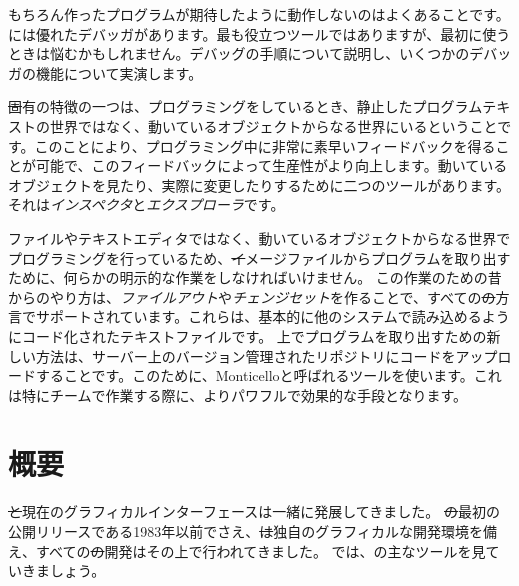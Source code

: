 \documentclass[a4paper,10pt,twoside]{book}
\begin{document}
もちろん作ったプログラムが期待したように動作しないのはよくあることです。\pharo には優れたデバッガがあります。最も役立つツールではありますが、最初に使うときは悩むかもしれません。デバッグの手順について説明し、いくつかのデバッガの機能について実演します。

\st 固有の特徴の一つは、プログラミングをしているとき、静止したプログラムテキストの世界ではなく、動いているオブジェクトからなる世界にいるということです。このことにより、プログラミング中に非常に素早いフィードバックを得ることが可能で、このフィードバックによって生産性がより向上します。動いているオブジェクトを見たり、実際に変更したりするために二つのツールがあります。それは\emph{インスペクタ}と\emph{エクスプローラ}です。

ファイルやテキストエディタではなく、動いているオブジェクトからなる世界でプログラミングを行っているため、\st イメージファイルからプログラムを取り出すために、何らかの明示的な作業をしなければいけません。
この作業のための昔からのやり方は、\emph{ファイルアウト}や\emph{チェンジセット}を作ることで、すべての\st の方言でサポートされています。これらは、基本的に他のシステムで読み込めるようにコード化されたテキストファイルです。
\pharo 上でプログラムを取り出すための新しい方法は、サーバー上のバージョン管理されたリポジトリにコードをアップロードすることです。このために、Monticelloと呼ばれるツールを使います。これは特にチームで作業する際に、よりパワフルで効果的な手段となります。


\section{概要}

\st と現在のグラフィカルインターフェースは一緒に発展してきました。
\st の最初の公開リリースである1983年以前でさえ、\st は独自のグラフィカルな開発環境を備え、すべての\st の開発はその上で行われてきました。
では、\pharo の主なツールを見ていきましょう。
\end{document}
